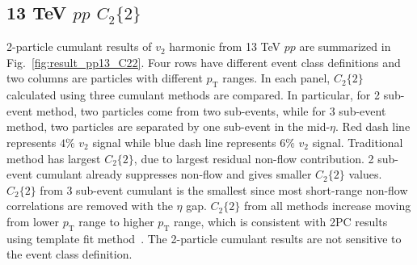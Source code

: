 \subsection{13 TeV $pp$ $C_{2}\{2\}$}
2-particle cumulant results of $v_{2}$ harmonic from 13 TeV $pp$ are summarized in Fig.~\ref{fig:result_pp13_C22}. Four rows have different event class definitions and two columns are particles with different $p_{\text{T}}$ ranges. In each panel, $C_{2}\{2\}$ calculated using three cumulant methods are compared. In particular, for 2 sub-event method, two particles come from two sub-events, while for 3 sub-event method, two particles are separated by one sub-event in the mid-$\eta$. Red dash line represents $4\%$ $v_{2}$ signal while blue dash line represents $6\%$ $v_{2}$ signal. Traditional method has largest $C_{2}\{2\}$, due to largest residual non-flow contribution. 2 sub-event cumulant already suppresses non-flow and gives smaller $C_{2}\{2\}$ values. $C_{2}\{2\}$ from 3 sub-event cumulant is the smallest since most short-range non-flow correlations are removed with the $\eta$ gap. $C_{2}\{2\}$ from all methods increase moving from lower $p_{\text{T}}$ range to higher $p_{\text{T}}$ range, which is consistent with 2PC results using template fit method~\cite{Aad:2014lta, Aaboud:2016yar}. The 2-particle cumulant results are not sensitive to the event class definition.
